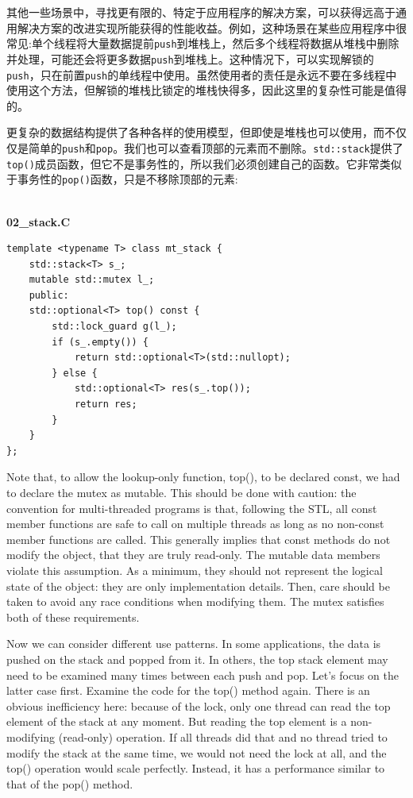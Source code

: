 其他一些场景中，寻找更有限的、特定于应用程序的解决方案，可以获得远高于通用解决方案的改进实现所能获得的性能收益。例如，这种场景在某些应用程序中很常见:单个线程将大量数据提前\texttt{push}到堆栈上，然后多个线程将数据从堆栈中删除并处理，可能还会将更多数据\texttt{push}到堆栈上。这种情况下，可以实现解锁的\texttt{push}，只在前置\texttt{push}的单线程中使用。虽然使用者的责任是永远不要在多线程中使用这个方法，但解锁的堆栈比锁定的堆栈快得多，因此这里的复杂性可能是值得的。

更复杂的数据结构提供了各种各样的使用模型，但即使是堆栈也可以使用，而不仅仅是简单的\texttt{push}和\texttt{pop}。我们也可以查看顶部的元素而不删除。\texttt{std::stack}提供了\texttt{top()}成员函数，但它不是事务性的，所以我们必须创建自己的函数。它非常类似于事务性的\texttt{pop()}函数，只是不移除顶部的元素:

\hspace*{\fill} \\ %
\noindent
\textbf{02\_stack.C}
\begin{lstlisting}[style=styleCXX]
template <typename T> class mt_stack {
	std::stack<T> s_;
	mutable std::mutex l_;
	public:
	std::optional<T> top() const {
		std::lock_guard g(l_);
		if (s_.empty()) {
			return std::optional<T>(std::nullopt);
		} else {
			std::optional<T> res(s_.top());
			return res;
		}
	}
};
\end{lstlisting}

Note that, to allow the lookup-only function, top(), to be declared const, we had to declare the mutex as mutable. This should be done with caution: the convention for multi-threaded programs is that, following the STL, all const member functions are safe to call on multiple threads as long as no non-const member functions are called. This generally implies that const methods do not modify the object, that they are truly read-only. The mutable data members violate this assumption. As a minimum, they should not represent the logical state of the object: they are only implementation details. Then, care should be taken to avoid any race conditions when modifying them. The mutex satisfies both of these requirements.

Now we can consider different use patterns. In some applications, the data is pushed on the stack and popped from it. In others, the top stack element may need to be examined many times between each push and pop. Let's focus on the latter case first. Examine the code for the top() method again. There is an obvious inefficiency here: because of the lock, only one thread can read the top element of the stack at any moment. But reading the top element is a non-modifying (read-only) operation. If all threads did that and no thread tried to modify the stack at the same time, we would not need the lock at all, and the top() operation would scale perfectly. Instead, it has a performance similar to that of the pop() method.

